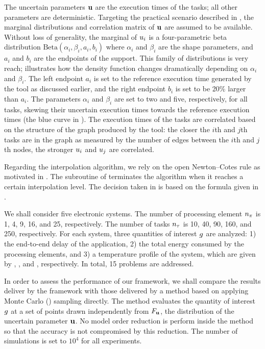 
The uncertain parameters $\mathbf{u}$ are the execution times of the tasks; all other
parameters are deterministic. Targeting the practical scenario described in
, the marginal distributions and correlation matrix
of $\mathbf{u}$ are assumed to be available. Without loss of generality, the marginal
of $u_i$ is a four-parametric beta distribution $\text{Beta}(\alpha_i, \beta_i,
a_i, b_i)$ where $\alpha_i$ and $\beta_i$ are the shape parameters, and $a_i$
and $b_i$ are the endpoints of the support. This family of distributions is very
reach;  illustrates how the density function changes
dramatically depending on $\alpha_i$ and $\beta_i$. The left endpoint $a_i$ is
set to the reference execution time generated by the  tool as
discussed earlier, and the right endpoint $b_i$ is set to be 20\% larger than
$a_i$. The parameters $\alpha_i$ and $\beta_i$ are set to two and five,
respectively, for all tasks, skewing their uncertain execution times towards the
reference execution times (the blue curve in ). The execution
times of the tasks are correlated based on the structure of the graph produced
by the  tool: the closer the $i$th and $j$th tasks are in the graph
as measured by the number of edges between the $i$th and $j$th nodes, the
stronger $u_i$ and $u_j$ are correlated.

Regarding the interpolation algorithm, we rely on the open Newton--Cotes rule as
motivated in . The  subroutine of
 terminates the algorithm when it reaches a certain
interpolation level. The decision taken in  is based on the
formula given in .

We shall consider five electronic systems. The number of processing element
${n_\pi}$ is 1, 4, 9, 16, and 25, respectively. The number of tasks ${n_\tau}$ is 10, 40,
90, 160, and 250, respectively. For each system, three quantities of interest
$g$ are analyzed: 1) the end-to-end delay of the application, 2) the total
energy consumed by the processing elements, and 3) a temperature profile of the
system, which are given by , , and
, respectively. In total, 15 problems are addressed.

In order to assess the performance of our framework, we shall compare the
results deliver by the framework with those delivered by a method based on
applying Monte Carlo () sampling directly. The  method
evaluates the quantity of interest $g$ at a set of points drawn independently
from $F_{\mathbf{u}}$, the distribution of the uncertain parameter $\mathbf{u}$. No
model order reduction is perform inside the  method so that the
accuracy is not compromised by this reduction. The number of 
simulations is set to $10^4$ for all experiments.

